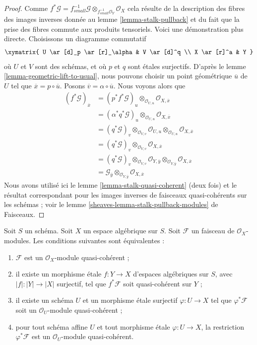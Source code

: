 \begin{proof}
Comme $f^*\mathcal{G} =
f_{small}^{-1}\mathcal{G} \otimes_{f_{small}^{-1}\mathcal{O}_Y} \mathcal{O}_X$
cela résulte de la description des fibres des images inverses donnée au
lemme \ref{lemma-stalk-pullback}
et du fait que la prise des fibres commute aux produits tensoriels.
Voici une démonstration plus directe.
Choisissons un diagramme commutatif
$$
\xymatrix{
U \ar[d]_p \ar[r]_\alpha  & V \ar[d]^q \\
X \ar[r]^a & Y
}
$$
où $U$ et $V$ sont des schémas, et où $p$ et $q$ sont \'etales surjectifs.
D'après le
lemme \ref{lemma-geometric-lift-to-usual},
nous pouvons choisir un point géométrique $\overline{u}$ de $U$ tel que
$\overline{x} = p \circ \overline{u}$. Posons
$\overline{v} = \alpha \circ \overline{u}$.
Nous voyons alors que
\begin{align*}
(f^*\mathcal{G})_{\overline{x}} & =
(p^*f^*\mathcal{G})_u \otimes_{\mathcal{O}_{U, u}}
\mathcal{O}_{X, \overline{x}} \\
& = (\alpha^*q^*\mathcal{G})_u \otimes_{\mathcal{O}_{U, u}}
\mathcal{O}_{X, \overline{x}} \\
& = (q^*\mathcal{G})_v \otimes_{\mathcal{O}_{V, v}}
\mathcal{O}_{U, u} \otimes_{\mathcal{O}_{U, u}}
\mathcal{O}_{X, \overline{x}} \\
& = (q^*\mathcal{G})_v \otimes_{\mathcal{O}_{V, v}}
\mathcal{O}_{X, \overline{x}} \\
& = (q^*\mathcal{G})_v \otimes_{\mathcal{O}_{V, v}}
\mathcal{O}_{Y, \overline{y}} \otimes_{\mathcal{O}_{Y, \overline{y}}}
\mathcal{O}_{X, \overline{x}} \\
& = \mathcal{G}_{\overline{y}} \otimes_{\mathcal{O}_{Y, \overline{y}}}
\mathcal{O}_{X, \overline{x}}
\end{align*}
Nous avons utilisé ici
le lemme \ref{lemma-stalk-quasi-coherent} (deux fois)
et le résultat correspondant pour les images inverses de faisceaux quasi-cohérents
sur les schémas ; voir le
lemme \ref{sheaves-lemma-stalk-pullback-modules} de Faisceaux.
\end{proof}

\begin{lemma}
\label{lemma-characterize-quasi-coherent}
Soit $S$ un schéma. Soit $X$ un espace algébrique sur $S$.
Soit $\mathcal{F}$ un faisceau de $\mathcal{O}_X$-modules.
Les conditions suivantes sont équivalentes :
\begin{enumerate}
\item $\mathcal{F}$ est un $\mathcal{O}_X$-module quasi-cohérent ;
\item il existe un morphisme \'etale $f : Y \to X$
d'espaces algébriques sur $S$, avec $|f| : |Y| \to |X|$ surjectif,
tel que $f^*\mathcal{F}$ soit quasi-cohérent sur $Y$ ;
\item il existe un schéma $U$ et un morphisme \'etale surjectif
$\varphi : U \to X$ tel que $\varphi^*\mathcal{F}$ soit un
$\mathcal{O}_U$-module quasi-cohérent ;
\item pour tout schéma affine $U$ et tout morphisme \'etale $\varphi : U \to X$, la
restriction $\varphi^*\mathcal{F}$ est un $\mathcal{O}_U$-module quasi-cohérent.
\end{enumerate}
\end{lemma}

